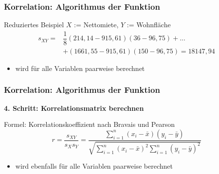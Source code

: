 \documentclass{beamer}
\begin{document}
\begin{frame}
	\frametitle{Korrelation: Algorithmus der Funktion}

	\begin{block}{Reduziertes Beispiel}
	  $X$ := Nettomiete, $Y$ := Wohnfläche
		\begin{equation*}
				\begin{align*}
				s_{XY}=&\dfrac{1}{8}(214,14-915,61)(36-96,75)+...\\
				&+(1661,55-915,61)(150-96,75)=18147,94
				\end{align*}
		\end{equation*}
	\end{block}
	
	\begin{itemize}
		\item wird für alle Variablen paarweise berechnet
	\end{itemize}
\end{frame}

\begin{frame}
	\frametitle{Korrelation: Algorithmus der Funktion}

	\par \textbf{4. Schritt: Korrelationsmatrix berechnen}\\[3mm]
	
	\begin{block}{Formel: Korrelationskoeffizient nach Bravais und Pearson}
		\begin{equation*}
			r=\dfrac{s_{XY}}{s_Xs_Y}=\dfrac{\sum_{i=1}^{n}{(x_i-\bar{x})(y_i-\bar{y})}}{\sqrt{\sum_{i=1}^{n}{(x_i-\bar{x})^2\sum_{i=1}^{n}{(y_i-\bar{y})^2}}}}
		\end{equation*}
	\end{block}
	
	\begin{itemize}
		\item wird ebenfalls für alle Variablen paarweise berechnet
	\end{itemize}
\end{frame}
\end{document}
